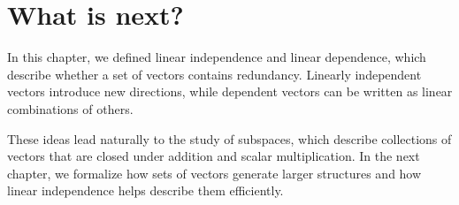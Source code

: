 \section{What is next?}
In this chapter, we defined linear independence and linear dependence, which describe whether a set of vectors contains redundancy. Linearly independent vectors introduce new directions, while dependent vectors can be written as linear combinations of others.

These ideas lead naturally to the study of subspaces, which describe collections of vectors that are closed under addition and scalar multiplication. In the next chapter, we formalize how sets of vectors generate larger structures and how linear independence helps describe them efficiently.
